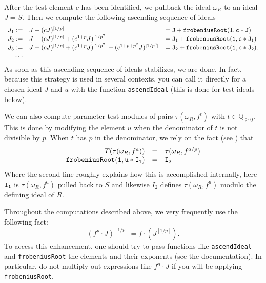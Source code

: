 \documentclass[11pt]{amsart}
\begin{document}
After the test element $c$ has been identified, we pullback the ideal $\omega_R$ to an ideal $J = S$.  Then we compute the following ascending sequence of ideals
\begin{equation}
\label{eq.AscendIdealExplanation}
\begin{array}{rll}
J_1 := &  J + (c J)^{[1/p]} & = {\tt J + frobeniusRoot(1, c*J)}\\
J_2 := & J + (c J)^{[1/p]} + (c^{1+p} J)^{[1/p^2]} & = {\tt J_1 + frobeniusRoot(1, c*J_1)}\\
J_3 := & J + (c J)^{[1/p]} + (c^{1+p} J)^{[1/p^2]} + (c^{1+p+p^2} J)^{[1/p^3]} & = {\tt J_2 + frobeniusRoot(1, c*J_2)}.\\
\dots
\end{array}
\end{equation}
As soon as this ascending sequence of ideals stabilizes, we are done.
In fact, because this strategy is used in several contexts, you can call it directly for a chosen ideal $J$ and $u$ with the function {\tt ascendIdeal} (this is done for test ideals below).

We can also compute parameter test modules of pairs $\tau(\omega_R, f^{t})$ with $t \in \mathbb{Q}_{\geq 0}$.  This is done by modifying the element $u$ when the denominator of $t$ is not divisible by $p$.  When $t$ has $p$ in the denominator, we rely on the fact (see \cite{BlickleMustataSmithDiscretenessAndRationalityOfFThresholds,SchwedeTuckerTestIdealFiniteMaps}) that
\[
\begin{array}{rcl}
T(\tau(\omega_R, f^a)) & = & \tau(\omega_R, f^{a/p})\\
{\tt frobeniusRoot(1, u*I_1)} & {\tt =} & {\tt I_2}
\end{array}
\]
Where the second line roughly explains how this is accomplished internally, here ${\tt I_1}$ is $\tau(\omega_R, f^a)$ pulled back to $S$ and likewise $I_2$ defines $\tau(\omega_R, f^a)$ modulo the defining ideal of $R$.

\begin{remark}
Throughout the computations described above, we very frequently use the following fact:
\[
(f^p \cdot J)^{[1/p]} = f \cdot (J^{[1/p]}).
\]
To access this enhancement, one should try to pass functions like {\tt ascendIdeal} and {\tt frobeniusRoot} the elements and their exponents (see the documentation).  In particular, do not multiply out expressions like $f^n \cdot J$ if you will be applying {\tt frobeniusRoot}.
\end{remark}
\end{document}

